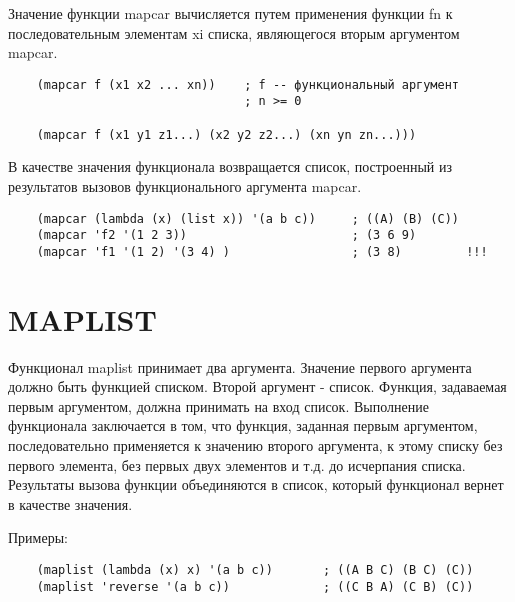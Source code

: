 Значение функции mapcar вычисляется путем применения функции fn к последовательным элементам xi списка, являющегося вторым аргументом mapcar.

\begin{lstlisting}
    (mapcar f (x1 x2 ... xn))    ; f -- функциональный аргумент 
                                 ; n >= 0

    (mapcar f (x1 y1 z1...) (x2 y2 z2...) (xn yn zn...)))
\end{lstlisting}

В качестве значения функционала возвращается список, построенный из результатов вызовов функционального аргумента mapcar.

\begin{lstlisting}
    (mapcar (lambda (x) (list x)) '(a b c))     ; ((A) (B) (C)) 
    (mapcar 'f2 '(1 2 3))                       ; (3 6 9)
    (mapcar 'f1 '(1 2) '(3 4) )                 ; (3 8)         !!!
\end{lstlisting}

\section{MAPLIST}

Функционал maplist принимает два аргумента. Значение первого аргумента должно быть функцией списком. Второй аргумент - список. Функция, задаваемая первым аргументом, должна принимать на вход список. Выполнение функционала заключается в том, что функция, заданная первым аргументом, последовательно применяется к значению второго аргумента, к этому списку без первого элемента, без первых двух элементов и т.д. до исчерпания списка. Результаты вызова функции объединяются в список, который функционал вернет в качестве значения. 

Примеры:
\begin{lstlisting}
    (maplist (lambda (x) x) '(a b c))       ; ((A B C) (B C) (C))
    (maplist 'reverse '(a b c))             ; ((C B A) (C B) (C)) 
\end{lstlisting}